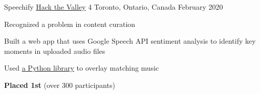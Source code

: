 
\begin{cventries}

  \cventry
    {Speechify} %
    {\href{https://hackthevalley.io/}{Hack the Valley} 4} %
    {Toronto, Ontario, Canada} %
    {February 2020} %
    {
      \begin{cvitems} %
        \item{Recognized a problem in content curation}
        \item{Built a web app that uses Google Speech API sentiment analysis to identify key moments in uploaded audio files}
        \item{Used \href{https://pypi.org/project/pydub/}{a Python library} to overlay matching music}
        \item {\textbf{Placed 1st} (over 300 participants)}
      \end{cvitems}
    }


\end{cventries}
